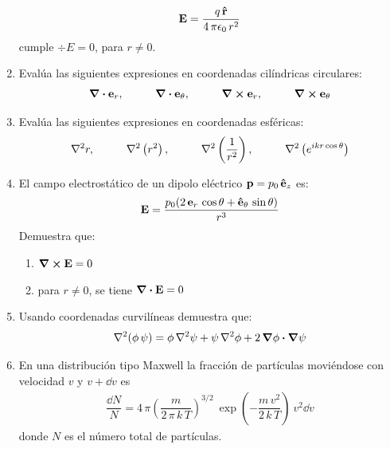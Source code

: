 \documentclass[12pt]{article}
\begin{document}
\begin{enumerate}
\begin{align*}
\vb{E} = \dfrac{q \, \vu{r}}{4 \, \pi \epsilon_{0} \, r^{2}}
\end{align*}
cumple $\div{E} = 0$, para $r \neq 0$.
\item Evalúa las siguientes expresiones en coordenadas cilíndricas circulares:
\begin{align*}
\div{\vb{e}_{r}}, \hspace{1cm} \div{\vb{e}_{\theta}}, \hspace{1cm} \curl{\vb{e}_{r}},  \hspace{1cm} \curl{\vb{e}_{\theta}}
\end{align*}
\item Evalúa las siguientes expresiones en coordenadas esféricas:
\begin{align*}
\laplacian{r}, \hspace{1cm} \laplacian{\left( r^{2} \right)}, \hspace{1cm} \laplacian{\left( \dfrac{1}{r^{2}} \right)}, \hspace{1cm} \laplacian{\left( e^{i k r \cos \theta} \right)}
\end{align*}
\item El campo electrostático de un dipolo eléctrico $\vb{p} = p_{0} \, \vu{e}_{z}$ es:
\begin{align*}
\vb{E} = \dfrac{p_{0} (2 \, \vb{e}_{r} \, \cos \theta + \vu{e}_{\theta} \, \sin \theta)}{r^{3}}
\end{align*}
Demuestra que:
\begin{enumerate}[label=\arabic{enumi}.\arabic*)]
\item $\curl{\vb{E}} = 0$
\item para $r \neq 0$, se tiene $\div{\vb{E}} = 0$
\end{enumerate}
\item Usando coordenadas curvilíneas demuestra que:
\begin{align*}
\laplacian{(\phi \, \psi)} = \phi \, \laplacian{\psi} + \psi \, \laplacian{\phi} + 2 \, \grad{\phi} \vdot \grad{\psi}
\end{align*}
\item En una distribución tipo Maxwell la fracción de partículas moviéndose con velocidad $v$ y $v +\dd{v}$ es
\begin{align*}
\dfrac{\dd{N}}{N} = 4 \, \pi \left( \dfrac{m}{2 \, \pi \, k \, T} \right)^{3/2} \: \exp \left( - \dfrac{m \, v^{2}}{2 \, k \, T} \right) \: v^{2} \dd{v}
\end{align*}
donde $N$ es el número total de partículas. 
\par

\end{enumerate}
\end{document}
